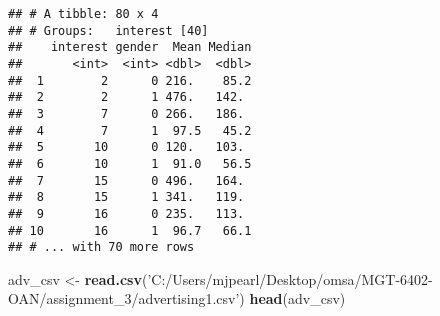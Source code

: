 \documentclass[
]{article}
\newenvironment{Shaded}{\begin{snugshade}}{\end{snugshade}}
\newcommand{\DataTypeTok}[1]{\textcolor[rgb]{0.13,0.29,0.53}{#1}}
\newcommand{\DecValTok}[1]{\textcolor[rgb]{0.00,0.00,0.81}{#1}}
\newcommand{\KeywordTok}[1]{\textcolor[rgb]{0.13,0.29,0.53}{\textbf{#1}}}
\newcommand{\NormalTok}[1]{#1}
\newcommand{\OperatorTok}[1]{\textcolor[rgb]{0.81,0.36,0.00}{\textbf{#1}}}
\newcommand{\StringTok}[1]{\textcolor[rgb]{0.31,0.60,0.02}{#1}}
\begin{document}
\begin{Shaded}
\end{Shaded}

\begin{verbatim}
## # A tibble: 80 x 4
## # Groups:   interest [40]
##    interest gender  Mean Median
##       <int>  <int> <dbl>  <dbl>
##  1        2      0 216.    85.2
##  2        2      1 476.   142. 
##  3        7      0 266.   186. 
##  4        7      1  97.5   45.2
##  5       10      0 120.   103. 
##  6       10      1  91.0   56.5
##  7       15      0 496.   164. 
##  8       15      1 341.   119. 
##  9       16      0 235.   113. 
## 10       16      1  96.7   66.1
## # ... with 70 more rows
\end{verbatim}

\begin{Shaded}
\begin{Highlighting}[]
\NormalTok{adv_csv <-}\StringTok{ }\KeywordTok{read.csv}\NormalTok{(}\StringTok{'C:/Users/mjpearl/Desktop/omsa/MGT-6402-OAN/assignment_3/advertising1.csv'}\NormalTok{)}
\KeywordTok{head}\NormalTok{(adv_csv)}
\end{Highlighting}
\end{Shaded}
\end{document}
